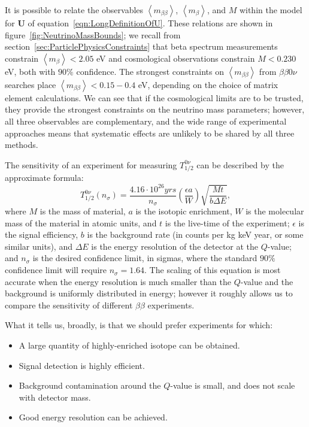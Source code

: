 It is possible to relate the observables $\left< m_{\beta\beta} \right>$, $\left< m_\beta \right>$, and $M$ within the model for $\mathbf{U}$ of equation~\ref{eqn:LongDefinitionOfU}.  These relations are shown in figure~\ref{fig:NeutrinoMassBounds}; we recall from section~\ref{sec:ParticlePhysicsConstraints} that beta spectrum measurements constrain $\left<m_\beta\right> < 2.05$ eV and cosmological observations constrain $M < 0.230$ eV, both with $90\%$ confidence.  The strongest constraints on $\left<m_{\beta\beta}\right>$ from $\beta\beta 0\nu$ searches place $\left<m_{\beta\beta}\right> < 0.15-0.4$ eV, depending on the choice of matrix element calculations.  We can see that if the cosmological limits are to be trusted, they provide the strongest constraints on the neutrino mass parameters; however, all three observables are complementary, and the wide range of experimental approaches means that systematic effects are unlikely to be shared by all three methods.

The sensitivity of an experiment for measuring $T_{1/2}^{0\nu}$ can be described by the approximate formula:~\cite{RMPbb0n}
\begin{equation}\label{eqn:ApproxHalflifeSensitivity}
T_{1/2}^{0\nu}(n_\sigma) = \frac{4.16 \cdot 10^{26} yrs}{n_\sigma} \left( \frac{\epsilon a}{W}\right) \sqrt{\frac{Mt}{b \Delta E}},
\end{equation}
where $M$ is the mass of material, $a$ is the isotopic enrichment, $W$ is the molecular mass of the material in atomic units, and $t$ is the live-time of the experiment; $\epsilon$ is the signal efficiency, $b$ is the background rate (in counts per kg keV year, or some similar units), and $\Delta E$ is the energy resolution of the detector at the $Q$-value; and $n_\sigma$ is the desired confidence limit, in sigmas, where the standard $90\%$ confidence limit will require $n_\sigma = 1.64$.  The scaling of this equation is most accurate when the energy resolution is much smaller than the $Q$-value and the background is uniformly distributed in energy; however it roughly allows us to compare the sensitivity of different $\beta\beta$ experiments.

What it tells us, broadly, is that we should prefer experiments for which:
\begin{itemize}
\item A large quantity of highly-enriched isotope can be obtained.
\item Signal detection is highly efficient.
\item Background contamination around the $Q$-value is small, and does not scale with detector mass.
\item Good energy resolution can be achieved.
\end{itemize}

